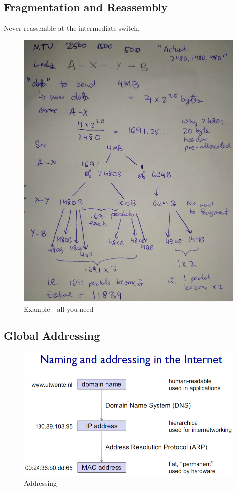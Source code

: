 \documentclass[12pt]{book}
\begin{document}
\subsection{Fragmentation and Reassembly}
Never reassemble at the intermediate switch.
\begin{figure}[H]
    \centering
    \includegraphics[width = \textwidth]{Pictures/MTU fragmentation.png}
    \caption{Example - all you need}
    \label{fig:example}
\end{figure}

\subsection{Global Addressing}
\begin{figure}[H]
    \centering
    \includegraphics[width = \textwidth]{Pictures/Addressing.png}
    \caption{Addressing}
    \label{fig:my_label}
\end{figure}
\end{document}
